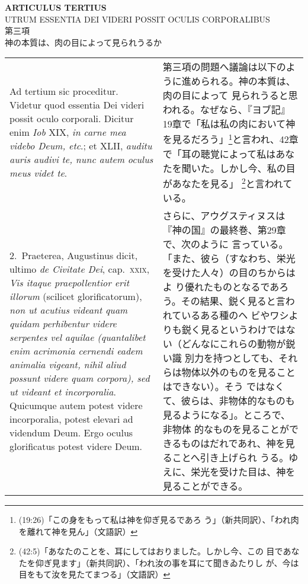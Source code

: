 \documentclass[10pt]{jsarticle} %
\begin{document}
\begin{center}
{\Large {\bf ARTICULUS TERTIUS}}\\
{\large UTRUM ESSENTIA DEI VIDERI POSSIT OCULIS CORPORALIBUS}\\
{\large 第三項\\神の本質は、肉の目によって見られうるか}
\end{center}

\begin{longtable}{p{21em}p{21em}}

{\sc \large Ad tertium sic proceditur}. Videtur quod essentia Dei videri
possit oculo corporali. Dicitur enim {\it Iob} XIX, {\it in carne mea videbo Deum,
etc}.; et XLII, {\it auditu auris audivi te, nunc autem oculus meus videt te}.

&

第三項の問題へ議論は以下のように進められる。神の本質は、肉の目によって
見られうると思われる。なぜなら、『ヨブ記』19章で「私は私の肉において神
を見るだろう」\footnote{(19:26)「この身をもって私は神を仰ぎ見るであろ
う」（新共同訳）、「われ肉を離れて神を見ん」（文語訳）}と言われ、42章
で「耳の聴覚によって私はあなたを聞いた。しかし今、私の目があなたを見る」
\footnote{(42:5)「あなたのことを、耳にしてはおりました。しかし今、この
目であなたを仰ぎ見ます」（新共同訳）、「われ汝の事を耳にて聞きゐたりし
が、今は目をもて汝を見たてまつる」（文語訳）}と言われている。

\\

2.~{\sc Praeterea}, Augustinus dicit, ultimo {\it de Civitate Dei},
cap.\ {\scshape xxix}, {\it Vis itaque praepollentior erit illorum}
(scilicet glorificatorum), {\it non ut acutius videant quam quidam
perhibentur videre serpentes vel aquilae (quantalibet enim acrimonia
cernendi eadem animalia vigeant, nihil aliud possunt videre quam
corpora), sed ut videant et incorporalia}.  Quicumque autem potest
videre incorporalia, potest elevari ad videndum Deum. Ergo oculus
glorificatus potest videre Deum.

&

さらに、アウグスティヌスは『神の国』の最終巻、第29章で、次のように
言っている。「また、彼ら（すなわち、栄光を受けた人々）の目のちからはよ
り優れたものとなるであろう。その結果、鋭く見ると言われているある種のヘ
ビやワシよりも鋭く見るというわけではない（どんなにこれらの動物が鋭い識
別力を持つとしても、それらは物体以外のものを見ることはできない）。そう
ではなくて、彼らは、非物体的なものも見るようになる」。ところで、非物体
的なものを見ることができるものはだれであれ、神を見ることへ引き上げられ
うる。ゆえに、栄光を受けた目は、神を見ることができる。


\end{longtable}
\end{document}
